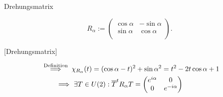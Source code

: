 \documentclass[class=article, crop=false]{standalone}
\begin{document}
\begin{zettel}{Drehungsmatrix}
\begin{flashcard}
	\begin{definition}
		\[
			R_{\alpha} :=
			\begin{pmatrix}
				\cos \alpha & -  \sin \alpha \\
				\sin \alpha & \cos \alpha    \\
			\end{pmatrix}
		.\]
	\end{definition}[Drehungsmatrix]
\end{flashcard}

\begin{remark}
	\begin{align*}
		\stackrel{\tx{ Definition } }{\implies} & \chi_{R_{\alpha}}(t) = ( \cos \alpha - t)^2 + \sin \alpha^2 = t^2 - 2t \cos \alpha +1 \\
		\implies                                & \exists T \in  U(2) : \bar{T}^t R_{\alpha} T =
		\begin{pmatrix}
			e^{i\alpha} & 0            \\
			0           & e^{-i\alpha} \\
		\end{pmatrix}
	\end{align*}
\end{remark}
\end{zettel}
\end{document}
